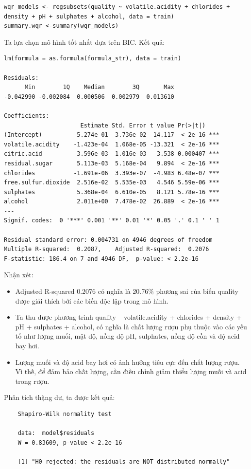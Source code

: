 \begin{lstlisting}
wqr_models <- regsubsets(quality ~ volatile.acidity + chlorides + density + pH + sulphates + alcohol, data = train)
summary.wqr <-summary(wqr_models)
\end{lstlisting}
Ta lựa chọn mô hình tốt nhất dựa trên BIC. Kết quả:
\begin{lstlisting}
lm(formula = as.formula(formula_str), data = train)

Residuals:
      Min        1Q    Median        3Q       Max 
-0.042990 -0.002084  0.000506  0.002979  0.013610 

Coefficients:
                      Estimate Std. Error t value Pr(>|t|)    
(Intercept)         -5.274e-01  3.736e-02 -14.117  < 2e-16 ***
volatile.acidity    -1.423e-04  1.068e-05 -13.321  < 2e-16 ***
citric.acid          3.596e-03  1.016e-03   3.538 0.000407 ***
residual.sugar       5.113e-03  5.168e-04   9.894  < 2e-16 ***
chlorides           -1.691e-06  3.393e-07  -4.983 6.48e-07 ***
free.sulfur.dioxide  2.516e-02  5.535e-03   4.546 5.59e-06 ***
sulphates            5.368e-04  6.610e-05   8.121 5.78e-16 ***
alcohol              2.011e+00  7.478e-02  26.889  < 2e-16 ***
---
Signif. codes:  0 '***' 0.001 '**' 0.01 '*' 0.05 '.' 0.1 ' ' 1

Residual standard error: 0.004731 on 4946 degrees of freedom
Multiple R-squared:  0.2087,	Adjusted R-squared:  0.2076 
F-statistic: 186.4 on 7 and 4946 DF,  p-value: < 2.2e-16
\end{lstlisting}

Nhận xét:
\begin{itemize}
    \item Adjusted R-squared 0.2076 có nghĩa là 20.76\% phương sai của biến quality được giải thích bởi các biến độc lập trong mô hình.
    \item Ta thu được phương trình quality ~ volatile.acidity + chlorides + density + pH + sulphates + alcohol, có nghĩa là chất lượng rượu phụ thuộc vào các yếu tố như lượng muối, mật độ, nồng độ pH, sulphates, nồng độ cồn và độ acid bay hơi. 
    \item Lượng muối và độ acid bay hơi có ảnh hưởng tiêu cực đến chất lượng rượu. Vì thế, để đảm bảo chất lượng, cần điều chỉnh giảm thiểu lượng muối và acid trong rượu.
\end{itemize}

Phân tích thặng dư, ta được kết quả:
\begin{lstlisting}
    Shapiro-Wilk normality test

    data:  model$residuals
    W = 0.83609, p-value < 2.2e-16
    
    [1] "H0 rejected: the residuals are NOT distributed normally"
\end{lstlisting}

